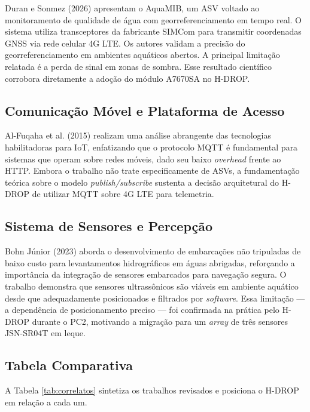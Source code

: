 \documentclass[12pt,a4paper]{article}
\begin{document}
Duran e Sonmez (2026) \cite{duran2026aquamib} apresentam o AquaMIB, um ASV voltado ao monitoramento de qualidade de água com georreferenciamento em tempo real. O sistema utiliza transceptores da fabricante SIMCom para transmitir coordenadas GNSS via rede celular 4G LTE. Os autores validam a precisão do georreferenciamento em ambientes aquáticos abertos. A principal limitação relatada é a perda de sinal em zonas de sombra. Esse resultado científico corrobora diretamente a adoção do módulo A7670SA no H-DROP.

\subsection{Comunicação Móvel e Plataforma de Acesso}

Al-Fuqaha et al. (2015) \cite{alfuqaha2015iot} realizam uma análise abrangente das tecnologias habilitadoras para IoT, enfatizando que o protocolo MQTT é fundamental para sistemas que operam sobre redes móveis, dado seu baixo \textit{overhead} frente ao HTTP. Embora o trabalho não trate especificamente de ASVs, a fundamentação teórica sobre o modelo \textit{publish/subscribe} sustenta a decisão arquitetural do H-DROP de utilizar MQTT sobre 4G LTE para telemetria.

\subsection{Sistema de Sensores e Percepção}

Bohn Júnior (2023) \cite{bohnjunior2023} aborda o desenvolvimento de embarcações não tripuladas de baixo custo para levantamentos hidrográficos em águas abrigadas, reforçando a importância da integração de sensores embarcados para navegação segura. O trabalho demonstra que sensores ultrassônicos são viáveis em ambiente aquático desde que adequadamente posicionados e filtrados por \textit{software}. Essa limitação — a dependência de posicionamento preciso — foi confirmada na prática pelo H-DROP durante o PC2, motivando a migração para um \textit{array} de três sensores JSN-SR04T em leque.

\subsection{Tabela Comparativa}

A Tabela \ref{tab:correlatos} sintetiza os trabalhos revisados e posiciona o H-DROP em relação a cada um.
\end{document}

